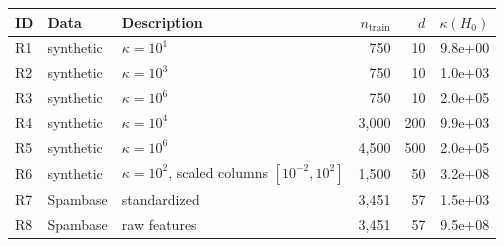 \begin{tabular}{lllrrr}
\toprule
ID & Data & Description & $n_{\text{train}}$ & $d$ & $\kappa(H_0)$ \\
\midrule
R1 & synthetic & $\kappa=10^{1}$ & 750 & 10 & 9.8e+00 \\
R2 & synthetic & $\kappa=10^{3}$ & 750 & 10 & 1.0e+03 \\
R3 & synthetic & $\kappa=10^{6}$ & 750 & 10 & 2.0e+05 \\
R4 & synthetic & $\kappa=10^{4}$ & 3,000 & 200 & 9.9e+03 \\
R5 & synthetic & $\kappa=10^{6}$ & 4,500 & 500 & 2.0e+05 \\
R6 & synthetic & $\kappa=10^{2}$, scaled columns $[10^{-2},10^{2}]$ & 1,500 & 50 & 3.2e+08 \\
R7 & Spambase & standardized & 3,451 & 57 & 1.5e+03 \\
R8 & Spambase & raw features & 3,451 & 57 & 9.5e+08 \\
\bottomrule
\end{tabular}